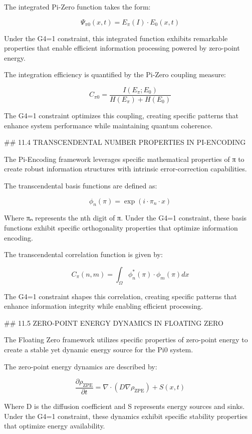 The integrated Pi-Zero function takes the form:

$$\Psi_{\pi 0}(x, t) = E_{\pi}(I) \cdot E_0(x, t)$$

Under the G4=1 constraint, this integrated function exhibits remarkable properties that enable efficient information processing powered by zero-point energy.

The integration efficiency is quantified by the Pi-Zero coupling measure:

$$C_{\pi 0} = \frac{I(E_{\pi}; E_0)}{H(E_{\pi}) + H(E_0)}$$

The G4=1 constraint optimizes this coupling, creating specific patterns that enhance system performance while maintaining quantum coherence.

## 11.4 TRANSCENDENTAL NUMBER PROPERTIES IN PI-ENCODING

The Pi-Encoding framework leverages specific mathematical properties of π to create robust information structures with intrinsic error-correction capabilities.

The transcendental basis functions are defined as:

$$\phi_n(\pi) = \exp(i \cdot \pi_n \cdot x)$$

Where πₙ represents the nth digit of π. Under the G4=1 constraint, these basis functions exhibit specific orthogonality properties that optimize information encoding.

The transcendental correlation function is given by:

$$C_{\pi}(n, m) = \int_{\Omega} \phi_n^*(\pi) \cdot \phi_m(\pi) dx$$

The G4=1 constraint shapes this correlation, creating specific patterns that enhance information integrity while enabling efficient processing.

## 11.5 ZERO-POINT ENERGY DYNAMICS IN FLOATING ZERO

The Floating Zero framework utilizes specific properties of zero-point energy to create a stable yet dynamic energy source for the Pi0 system.

The zero-point energy dynamics are described by:

$$\frac{\partial \rho_{\text{ZPE}}}{\partial t} = \nabla \cdot (D \nabla \rho_{\text{ZPE}}) + S(x, t)$$

Where D is the diffusion coefficient and S represents energy sources and sinks. Under the G4=1 constraint, these dynamics exhibit specific stability properties that optimize energy availability.

